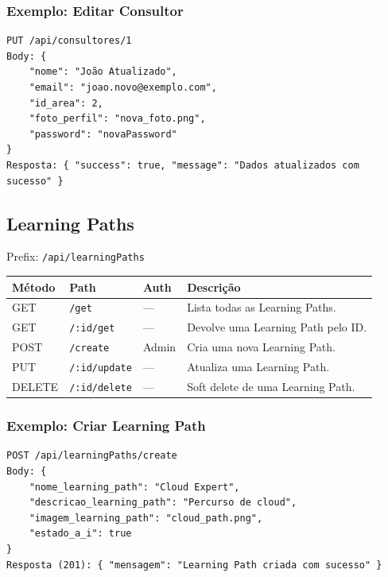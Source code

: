 \documentclass[12pt,a4paper]{article}
\begin{document}
\subsubsection*{Exemplo: Editar Consultor}
\begin{lstlisting}
PUT /api/consultores/1
Body: {
    "nome": "João Atualizado",
    "email": "joao.novo@exemplo.com",
    "id_area": 2,
    "foto_perfil": "nova_foto.png",
    "password": "novaPassword"
}
Resposta: { "success": true, "message": "Dados atualizados com sucesso" }
\end{lstlisting}

\subsection{Learning Paths}
\label{sec:learningpaths}

Prefix: \texttt{/api/learningPaths}

\begin{longtable}{@{}lllp{6cm}@{}}
    \toprule
    \textbf{Método} & \textbf{Path} & \textbf{Auth} & \textbf{Descrição} \\
    \midrule
    \endhead
    \bottomrule
    \endfoot

    GET    & \texttt{/get} & --- & Lista todas as Learning Paths. \\
    GET    & \texttt{/:id/get} & --- & Devolve uma Learning Path pelo ID. \\
    POST   & \texttt{/create} & Admin & Cria uma nova Learning Path. \\
    PUT    & \texttt{/:id/update} & --- & Atualiza uma Learning Path. \\
    DELETE & \texttt{/:id/delete} & --- & Soft delete de uma Learning Path. \\
\end{longtable}

\subsubsection*{Exemplo: Criar Learning Path}
\begin{lstlisting}
POST /api/learningPaths/create
Body: {
    "nome_learning_path": "Cloud Expert",
    "descricao_learning_path": "Percurso de cloud",
    "imagem_learning_path": "cloud_path.png",
    "estado_a_i": true
}
Resposta (201): { "mensagem": "Learning Path criada com sucesso" }
\end{lstlisting}
\end{document}
